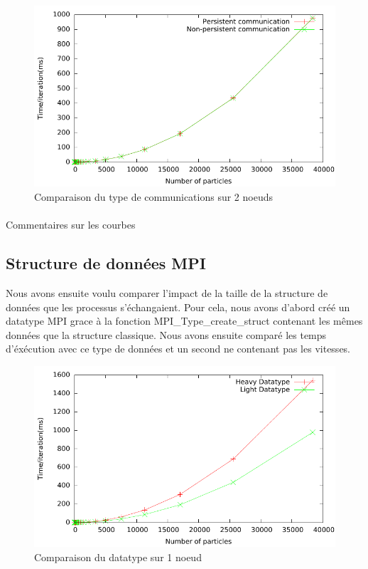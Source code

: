 \documentclass{article}
\begin{document}
\begin{figure}[h]
  \centering
  \includegraphics[scale=0.5]{ResultTDP2/mpi_comm/mpi_comm_multinode.pdf}
  \caption{\label{fig:tf(n)2}Comparaison du type de communications sur 2 noeuds}
\end{figure}


\paragraph{}
Commentaires sur les courbes

\subsection{Structure de données MPI}
Nous avons ensuite voulu comparer l'impact de la taille de la structure de données que les processus s'échangaient. Pour cela, nous avons d'abord créé un datatype MPI grace à la fonction MPI\_Type\_create\_struct contenant les mêmes données que la structure classique. Nous avons ensuite comparé les temps d'éxécution avec ce type de données et un second ne contenant pas les vitesses.

\begin{figure}[!h]
  \centering
  \includegraphics[scale=0.5]{ResultTDP2/mpi_datatype/mpi_datatype_singlenode.pdf}
  \caption{\label{fig:tf(n)data1}Comparaison du datatype sur 1 noeud}
\end{figure}
\end{document}
